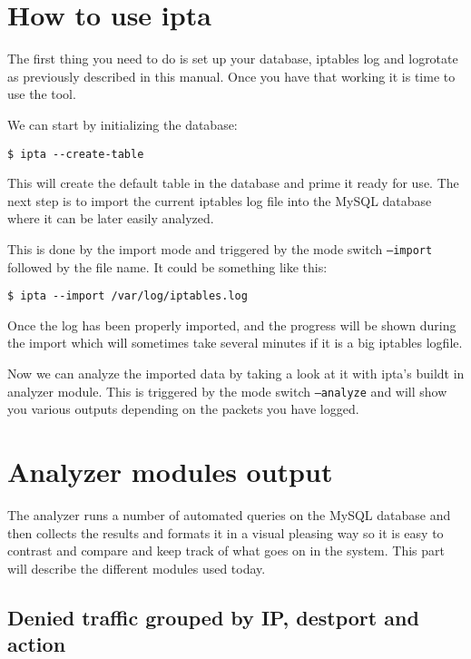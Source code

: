 \documentclass[english,twoside,openright,a4paper,12pt]{article}
\begin{document}
\section{How to use ipta}

The first thing you need to do is set up your database, iptables log
and logrotate as previously described in this manual. Once you have
that working it is time to use the tool.

We can start by initializing the database:

\begin{verbatim}
$ ipta --create-table
\end{verbatim}

This will create the default table in the database and prime it ready
for use. The next step is to import the current iptables log file into
the MySQL database where it can be later easily analyzed.

This is done by the import mode and triggered by the mode switch
\texttt{--import} followed by the file name. It could be something
like this:

\begin{verbatim}
$ ipta --import /var/log/iptables.log
\end{verbatim}

Once the log has been properly imported, and the progress will be
shown during the import which will sometimes take several minutes if
it is a big iptables logfile.

Now we can analyze the imported data by taking a look at it with
ipta's buildt in analyzer module. This is triggered by the mode switch
\texttt{--analyze} and will show you various outputs depending on the
packets you have logged.

\section{Analyzer modules output}

The analyzer runs a number of automated queries on the MySQL database
and then collects the results and formats it in a visual pleasing way
so it is easy to contrast and compare and keep track of what goes on
in the system. This part will describe the different modules used
today.

\subsection{Denied traffic grouped by IP, destport and action}
\end{document}
